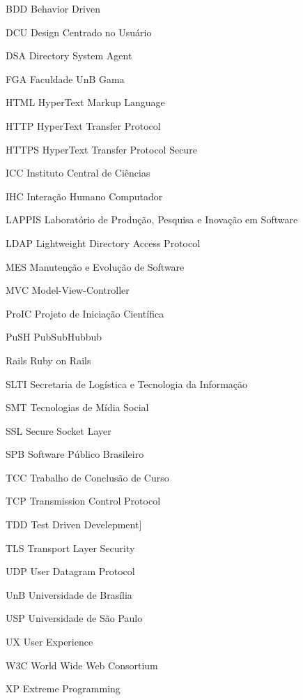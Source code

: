 \begin{siglas}
  \item[BDD] Behavior Driven 
  \item[DCU] Design Centrado no Usuário
  \item[DSA] Directory System Agent
  \item[FGA] Faculdade UnB Gama
  \item[HTML] HyperText Markup Language
  \item[HTTP] HyperText Transfer Protocol
  \item[HTTPS] HyperText Transfer Protocol Secure
  \item[ICC] Instituto Central de Ciências
  \item[IHC] Interação Humano Computador
  \item[LAPPIS] Laboratório de Produção, Pesquisa e Inovação em Software
  \item[LDAP] Lightweight Directory Access Protocol
  \item[MES] Manutenção e Evolução de Software
  \item[MVC] Model-View-Controller
  \item[ProIC] Projeto de Iniciação Científica
  \item[PuSH] PubSubHubbub
  \item[Rails] Ruby on Rails
  \item[SLTI] Secretaria de Logística e Tecnologia da Informação
  \item[SMT] Tecnologias de Mídia Social
  \item[SSL] Secure Socket Layer
  \item[SPB] Software Público Brasileiro
  \item[TCC] Trabalho de Conclusão de Curso
  \item[TCP] Transmission Control Protocol
  \item[TDD] Test Driven Develepment]
  \item[TLS] Transport Layer Security
  \item[UDP] User Datagram Protocol
  \item[UnB] Universidade de Brasília
  \item[USP] Universidade de São Paulo
  \item[UX] User Experience
  \item[W3C] World Wide Web Consortium
  \item[XP] Extreme Programming
\end{siglas}
